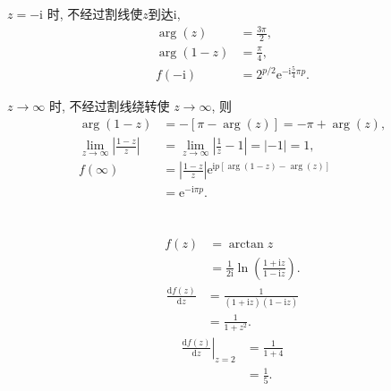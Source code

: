\documentclass[12pt]{article}
\newcommand{\mrm}[1]{\mathrm{#1}}
\begin{document}
\(z = -\mathrm{i}\) 时, 不经过割线使\(z\)到达\(\mrm i\),
\begin{align*}
\arg(z) &= \frac{3\pi}{2}, \\
\arg(1-z) &= \frac{\pi}{4}, \\
f(-\mathrm{i}) &= 2^{p/2} \mathrm{e}^{-\mathrm{i} \frac{5}{4} \pi p}.
\end{align*}

\(z \to \infty\) 时, 不经过割线绕转使 \(z \to \infty\), 则
\begin{align*}
\arg(1-z) &= -\left[ \pi - \arg(z) \right] = -\pi + \arg(z), \\
\lim_{z \to \infty} \left| \frac{1-z}{z} \right| &= \lim_{z \to \infty} \left| \frac{1}{z} - 1 \right| = |-1| = 1, \\
f(\infty) &= \left| \frac{1-z}{z} \right| \mathrm{e}^{\mathrm{i} p \left[ \arg(1-z) - \arg(z) \right]} \\
&= \mathrm{e}^{-\mathrm{i} \pi p}.
\end{align*}
\section{}
\begin{align*}
f(z) &= \arctan z \\
&= \frac{1}{2\mathrm{i}} \ln\left( \frac{1+\mathrm{i}z}{1-\mathrm{i}z} \right).
\end{align*}
\begin{align*}
\frac{\mathrm{d}f(z)}{\mathrm{d}z} &= \frac{1}{(1+\mathrm{i}z)(1-\mathrm{i}z)} \\
&= \frac{1}{1+z^2}.
\end{align*}
\begin{align*}
\left. \frac{\mathrm{d}f(z)}{\mathrm{d}z} \right|_{z=2} &= \frac{1}{1+4} \\
&= \frac{1}{5}.
\end{align*}
\end{document}
